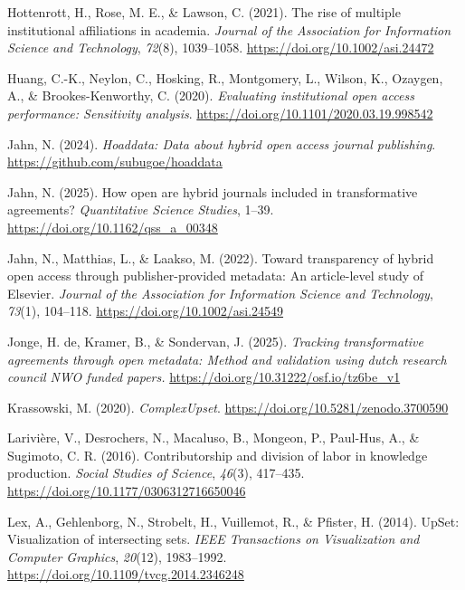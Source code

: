\documentclass[a4paper,man,floatsintext,longtable,noextraspace,10pt]{apa6}
\newlength{\cslhangindent}
\newenvironment{CSLReferences}[2] %
{\begin{list}{}{%
  \setlength{\itemindent}{0pt}
  \setlength{\leftmargin}{0pt}
  \setlength{\parsep}{0pt}
  \ifodd #1
  \setlength{\leftmargin}{\cslhangindent}
  \setlength{\itemindent}{-1\cslhangindent}
  \fi
  \setlength{\itemsep}{#2\baselineskip}}}
{\end{list}}
\begin{document}
\begin{CSLReferences}{1}{0}
Hottenrott, H., Rose, M. E., \& Lawson, C. (2021). The rise of multiple
institutional affiliations in academia. \emph{Journal of the Association
for Information Science and Technology}, \emph{72}(8), 1039--1058.
\url{https://doi.org/10.1002/asi.24472}

Huang, C.-K., Neylon, C., Hosking, R., Montgomery, L., Wilson, K.,
Ozaygen, A., \& Brookes-Kenworthy, C. (2020). \emph{Evaluating
institutional open access performance: Sensitivity analysis}.
\url{https://doi.org/10.1101/2020.03.19.998542}

Jahn, N. (2024). \emph{Hoaddata: Data about hybrid open access journal
publishing}. \url{https://github.com/subugoe/hoaddata}

Jahn, N. (2025). How open are hybrid journals included in transformative
agreements? \emph{Quantitative Science Studies}, 1--39.
\url{https://doi.org/10.1162/qss_a_00348}

Jahn, N., Matthias, L., \& Laakso, M. (2022). Toward transparency of
hybrid open access through publisher-provided metadata: An article-level
study of {Elsevier}. \emph{Journal of the Association for Information
Science and Technology}, \emph{73}(1), 104--118.
\url{https://doi.org/10.1002/asi.24549}

Jonge, H. de, Kramer, B., \& Sondervan, J. (2025). \emph{Tracking
transformative agreements through open metadata: Method and validation
using dutch research council NWO funded papers.}
\url{https://doi.org/10.31222/osf.io/tz6be_v1}

Krassowski, M. (2020). \emph{ComplexUpset}.
\url{https://doi.org/10.5281/zenodo.3700590}

Larivière, V., Desrochers, N., Macaluso, B., Mongeon, P., Paul-Hus, A.,
\& Sugimoto, C. R. (2016). Contributorship and division of labor in
knowledge production. \emph{Social Studies of Science}, \emph{46}(3),
417--435. \url{https://doi.org/10.1177/0306312716650046}

Lex, A., Gehlenborg, N., Strobelt, H., Vuillemot, R., \& Pfister, H.
(2014). UpSet: Visualization of intersecting sets. \emph{IEEE
Transactions on Visualization and Computer Graphics}, \emph{20}(12),
1983--1992. \url{https://doi.org/10.1109/tvcg.2014.2346248}


\end{CSLReferences}
\end{document}
